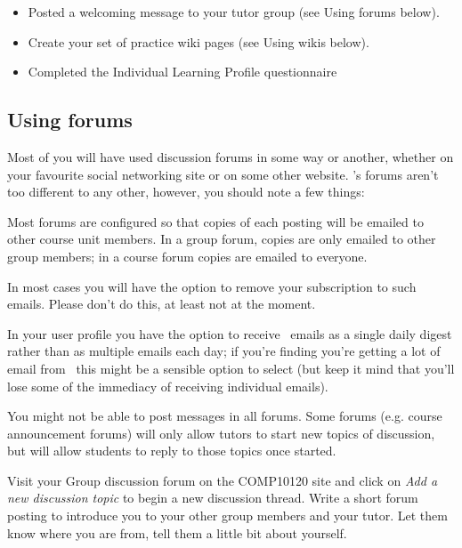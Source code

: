 \begin{itemize}
\item 
Posted a welcoming message to your tutor group (see Using forums below).

\item Create your set of practice wiki pages (see Using wikis below).

\item Completed the Individual Learning Profile questionnaire
\end{itemize}


\subsection{Using forums}
\label{sec:using-forums}


Most of you will have used discussion forums in some way or another, whether on your favourite social networking site or on some other website. \Moodle's forums aren't too different to any other, however, you should note a few things:

Most forums are configured so that copies of each posting will be emailed to other course unit members. In a group forum, copies are only emailed to other group members; in a course forum copies are emailed to everyone.

In most cases you will have the option to remove your subscription to such emails. Please don't do this, at least not at the moment.

In your user profile you have the option to receive \moodle\ emails as a single daily digest rather than as multiple emails each day; if you're finding you're getting a lot of email from \moodle\ this might be a sensible option to select (but keep it mind that you'll lose some of the immediacy of receiving individual emails). 

You might not be able to post messages in all forums. Some forums (e.g. course announcement forums) will only allow tutors to start new topics of discussion, but will allow students to reply to those topics once started.

Visit your Group discussion forum on the COMP10120 site and click on \emph{Add a new discussion topic}  to begin a new discussion thread. Write a short forum posting to introduce you to your other group members and your tutor. Let them know where you are from, tell them a little bit about yourself.

